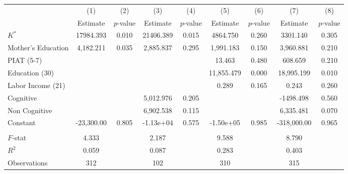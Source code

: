 \begin{tabular}{lcccccccc} \toprule
 & (1) & (2) & (3) & (4) & (5) & (6) & (7) & (8) \\
 & Estimate  & $p$-value  & Estimate  & $p$-value  & Estimate  & $p$-value  & Estimate  & $p$-value  \\  \midrule
$K^\ast$ & 17984.393 &     0.010 & 21406.389 &     0.015 &  4864.750 &     0.260 &  3301.140 &     0.305 \\
Mother's Education &  4,182.211 &     0.035 &  2,885.837 &     0.295 &  1,991.183 &     0.150 &  3,960.881 &     0.210 \\
PIAT (5-7) &         &         &         &         &    13.463 &     0.480 &   608.659 &     0.210 \\
Education (30) &         &         &         &         & 11,855.479 &     0.000 & 18,995.199 &     0.010 \\
Labor Income (21) &         &         &         &         &     0.289 &     0.165 &     0.243 &     0.260 \\
Cognitive &         &         &  5,012.976 &     0.205 &         &         & -1498.498 &     0.560 \\
Non Cognitive &         &         &  6,902.538 &     0.115 &         &         &  6,335.481 &     0.070 \\
Constant & -23,300.00 &     0.805 & -1.13e+04 &     0.575 & -1.50e+05 &     0.985 & -318,000.00 &     0.965 \\ \\ \midrule
$F$-stat &     4.333 &         &     2.187 &         &     9.588 &         &     8.790 &         \\
$R^2$ &     0.059 &         &     0.087 &         &     0.283 &         &     0.403 &         \\
Observations &   312 &         &   102 &         &   310 &         &   315 &         \\
\bottomrule \end{tabular}
